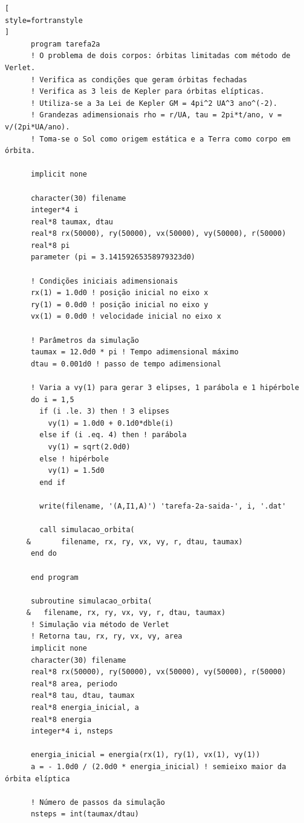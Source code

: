 \documentclass[12pt,a4paper]{article}
\begin{document}
\begin{lstlisting}[
style=fortranstyle
]
      program tarefa2a
      ! O problema de dois corpos: órbitas limitadas com método de Verlet.
      ! Verifica as condições que geram órbitas fechadas
      ! Verifica as 3 leis de Kepler para órbitas elípticas.
      ! Utiliza-se a 3a Lei de Kepler GM = 4pi^2 UA^3 ano^(-2).
      ! Grandezas adimensionais rho = r/UA, tau = 2pi*t/ano, v = v/(2pi*UA/ano).
      ! Toma-se o Sol como origem estática e a Terra como corpo em órbita.

      implicit none

      character(30) filename
      integer*4 i
      real*8 taumax, dtau
      real*8 rx(50000), ry(50000), vx(50000), vy(50000), r(50000)
      real*8 pi
      parameter (pi = 3.14159265358979323d0)

      ! Condições iniciais adimensionais
      rx(1) = 1.0d0 ! posição inicial no eixo x
      ry(1) = 0.0d0 ! posição inicial no eixo y
      vx(1) = 0.0d0 ! velocidade inicial no eixo x

      ! Parâmetros da simulação
      taumax = 12.0d0 * pi ! Tempo adimensional máximo
      dtau = 0.001d0 ! passo de tempo adimensional

      ! Varia a vy(1) para gerar 3 elipses, 1 parábola e 1 hipérbole
      do i = 1,5
        if (i .le. 3) then ! 3 elipses
          vy(1) = 1.0d0 + 0.1d0*dble(i)
        else if (i .eq. 4) then ! parábola
          vy(1) = sqrt(2.0d0)
        else ! hipérbole
          vy(1) = 1.5d0
        end if

        write(filename, '(A,I1,A)') 'tarefa-2a-saida-', i, '.dat'

        call simulacao_orbita(
     &       filename, rx, ry, vx, vy, r, dtau, taumax)
      end do

      end program

      subroutine simulacao_orbita(
     &   filename, rx, ry, vx, vy, r, dtau, taumax)
      ! Simulação via método de Verlet
      ! Retorna tau, rx, ry, vx, vy, area
      implicit none
      character(30) filename
      real*8 rx(50000), ry(50000), vx(50000), vy(50000), r(50000)
      real*8 area, periodo
      real*8 tau, dtau, taumax
      real*8 energia_inicial, a
      real*8 energia
      integer*4 i, nsteps

      energia_inicial = energia(rx(1), ry(1), vx(1), vy(1))
      a = - 1.0d0 / (2.0d0 * energia_inicial) ! semieixo maior da órbita elíptica

      ! Número de passos da simulação
      nsteps = int(taumax/dtau)


\end{lstlisting}
\end{document}
